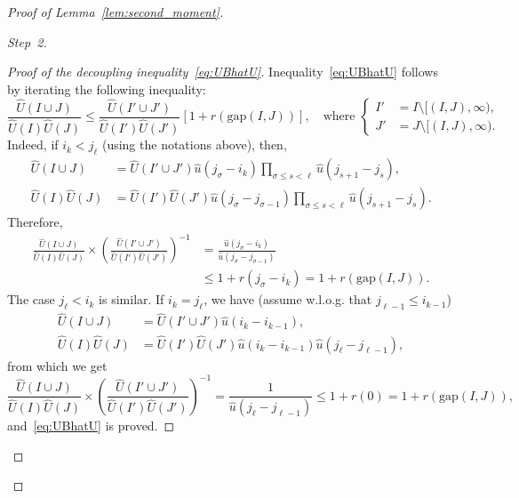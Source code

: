 \documentclass[AHL,Unicode,longabstracts]{cedram}
\newcommand{\hu}{\hat u}
\newcommand{\hU}{\hat U}
\newcommand{\gap}{{\mathrm{gap}}}
\newenvironment{step}[1]{\begin{proof}[#1]}{\let\qed\relax \end{proof}}
\begin{document}
\begin{proof}[Proof of Lemma~\ref{lem:second_moment}]
\begin{step}{Step~2}
\begin{proof}[Proof of the decoupling inequality~\eqref{eq:UBhatU}]
Inequality~\eqref{eq:UBhatU} follows by iterating the following inequality:
\begin{equation}
\frac{\hU(I \cup J)}{\hU(I) \hU(J)} \leq \frac{\hU(I' \cup J')}{\hU(I') \hU(J')}[1 + r(\gap(I,J))], \quad \text{where }\left\{
\begin{aligned}
I'&= I \setminus [(I,J),\infty),\\
J'&= J \setminus [(I,J),\infty).
\end{aligned}
\right.
\end{equation}
Indeed, if $i_k < j_\ell$ (using the notations above), then,
\begin{equation}
\begin{aligned}
\hU(I \cup J) &= \hU(I' \cup J') \hu(j_\sigma - i_k) \prod_{\sigma \leq s < \ell} \hu(j_{s+1}-j_s),\\
\hU(I)\hU(J) &= \hU(I')\hU(J') \hu(j_\sigma - j_{\sigma-1}) \prod_{\sigma \leq s < \ell} \hu(j_{s+1}-j_s).
\end{aligned}
\end{equation}
Therefore,
\begin{equation}
\begin{aligned}
\frac{\hU(I \cup J)}{\hU(I) \hU(J)} \times \left(\frac{\hU(I' \cup J')}{\hU(I') \hU(J')} \right)^{-1} &= \frac{\hu(j_\sigma - i_k)}{\hu(j_\sigma - j_{\sigma-1})}\\
& \leq 1 + r(j_\sigma - i_k) = 1 + r(\gap(I,J)).
\end{aligned}
\end{equation}
The case $j_\ell < i_k$ is similar. If $i_k = j_\ell$, we have (assume w.l.o.g. that $j_{\ell-1} \leq i_{k-1}$)
\begin{equation}
\begin{aligned}
\hU(I \cup J) &= \hU(I' \cup J') \hu(i_k - i_{k-1}),\\
\hU(I) \hU(J) &= \hU(I') \hU(J') \hu(i_k - i_{k-1}) \hu(j_\ell - j_{\ell-1}),
\end{aligned}
\end{equation}
from which we get
\begin{equation}
\frac{\hU(I \cup J)}{\hU(I) \hU(J)} \times \left(\frac{\hU(I' \cup J')}{\hU(I') \hU(J')} \right)^{-1} = \frac{1}{\hu(j_\ell - j_{\ell-1})} \leq 1 + r(0) = 1 + r(\gap(I,J)),
\end{equation}
and~\eqref{eq:UBhatU} is proved.
\end{proof}
\end{step}


\end{proof}
\end{document}
